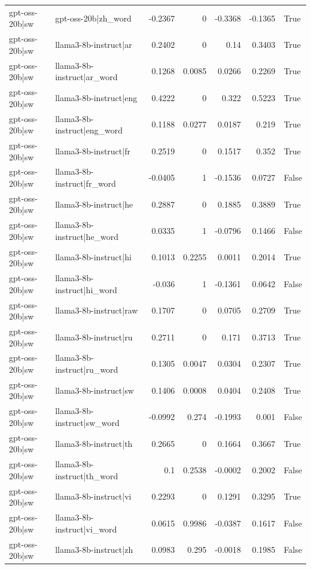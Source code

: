 \begin{table}
\begin{tabular}{l l r r r r l}
gpt-oss-20b|sw & gpt-oss-20b|zh_word & -0.2367 & 0 & -0.3368 & -0.1365 & True \\
gpt-oss-20b|sw & llama3-8b-instruct|ar & 0.2402 & 0 & 0.14 & 0.3403 & True \\
gpt-oss-20b|sw & llama3-8b-instruct|ar_word & 0.1268 & 0.0085 & 0.0266 & 0.2269 & True \\
gpt-oss-20b|sw & llama3-8b-instruct|eng & 0.4222 & 0 & 0.322 & 0.5223 & True \\
gpt-oss-20b|sw & llama3-8b-instruct|eng_word & 0.1188 & 0.0277 & 0.0187 & 0.219 & True \\
gpt-oss-20b|sw & llama3-8b-instruct|fr & 0.2519 & 0 & 0.1517 & 0.352 & True \\
gpt-oss-20b|sw & llama3-8b-instruct|fr_word & -0.0405 & 1 & -0.1536 & 0.0727 & False \\
gpt-oss-20b|sw & llama3-8b-instruct|he & 0.2887 & 0 & 0.1885 & 0.3889 & True \\
gpt-oss-20b|sw & llama3-8b-instruct|he_word & 0.0335 & 1 & -0.0796 & 0.1466 & False \\
gpt-oss-20b|sw & llama3-8b-instruct|hi & 0.1013 & 0.2255 & 0.0011 & 0.2014 & True \\
gpt-oss-20b|sw & llama3-8b-instruct|hi_word & -0.036 & 1 & -0.1361 & 0.0642 & False \\
gpt-oss-20b|sw & llama3-8b-instruct|raw & 0.1707 & 0 & 0.0705 & 0.2709 & True \\
gpt-oss-20b|sw & llama3-8b-instruct|ru & 0.2711 & 0 & 0.171 & 0.3713 & True \\
gpt-oss-20b|sw & llama3-8b-instruct|ru_word & 0.1305 & 0.0047 & 0.0304 & 0.2307 & True \\
gpt-oss-20b|sw & llama3-8b-instruct|sw & 0.1406 & 0.0008 & 0.0404 & 0.2408 & True \\
gpt-oss-20b|sw & llama3-8b-instruct|sw_word & -0.0992 & 0.274 & -0.1993 & 0.001 & False \\
gpt-oss-20b|sw & llama3-8b-instruct|th & 0.2665 & 0 & 0.1664 & 0.3667 & True \\
gpt-oss-20b|sw & llama3-8b-instruct|th_word & 0.1 & 0.2538 & -0.0002 & 0.2002 & False \\
gpt-oss-20b|sw & llama3-8b-instruct|vi & 0.2293 & 0 & 0.1291 & 0.3295 & True \\
gpt-oss-20b|sw & llama3-8b-instruct|vi_word & 0.0615 & 0.9986 & -0.0387 & 0.1617 & False \\
gpt-oss-20b|sw & llama3-8b-instruct|zh & 0.0983 & 0.295 & -0.0018 & 0.1985 & False \\

\end{tabular}
\end{table}
